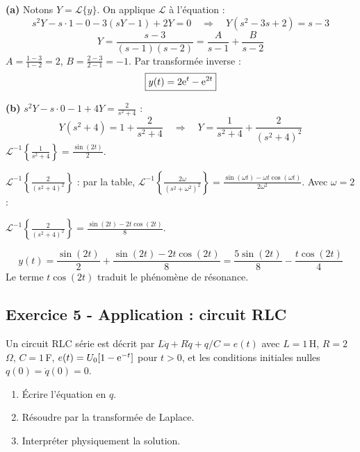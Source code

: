 \documentclass[12pt,a4paper]{article}
\begin{document}
\begin{boitecorrige}
\textbf{(a)} Notons $Y=\mathcal{L}\{y\}$. On applique $\mathcal{L}$ à l'équation :
\[
s^2Y-s\cdot1-0 - 3(sY-1) + 2Y = 0 \quad\Rightarrow\quad Y(s^2-3s+2) = s-3
\]
\[
Y = \frac{s-3}{(s-1)(s-2)} = \frac{A}{s-1}+\frac{B}{s-2}
\]
$A = \frac{1-3}{1-2}=2$, $B=\frac{2-3}{2-1}=-1$. Par transformée inverse :
\[
\boxed{y(t) = 2\mathrm{e}^t - \mathrm{e}^{2t}}
\]

\textbf{(b)} $s^2Y - s\cdot0 - 1 + 4Y = \frac{2}{s^2+4}$ :
\[
Y(s^2+4) = 1+\frac{2}{s^2+4} \quad\Rightarrow\quad Y = \frac{1}{s^2+4}+\frac{2}{(s^2+4)^2}
\]
$\mathcal{L}^{-1}\left\{\frac{1}{s^2+4}\right\} = \frac{\sin(2t)}{2}$.

$\mathcal{L}^{-1}\left\{\frac{2}{(s^2+4)^2}\right\}$ : par la table, $\mathcal{L}^{-1}\left\{\frac{2\omega}{(s^2+\omega^2)^2}\right\} = \frac{\sin(\omega t)-\omega t\cos(\omega t)}{2\omega^2}$. Avec $\omega=2$ :

$\mathcal{L}^{-1}\left\{\frac{2}{(s^2+4)^2}\right\} = \frac{\sin(2t)-2t\cos(2t)}{8}$.

\[
\boxed{y(t) = \frac{\sin(2t)}{2} + \frac{\sin(2t)-2t\cos(2t)}{8} = \frac{5\sin(2t)}{8} - \frac{t\cos(2t)}{4}}
\]
Le terme $t\cos(2t)$ traduit le phénomène de résonance.
\end{boitecorrige}

\subsection*{Exercice 5 - Application : circuit RLC \niveau{\difficile}}

\begin{boiteexercice}
Un circuit RLC série est décrit par $L\ddot{q} + R\dot{q} + q/C = e(t)$ avec $L=1$\,H, $R=2$\,$\Omega$, $C=1$\,F, $e(t)=U_0[1-\mathrm{e}^{-t}]$ pour $t>0$, et les conditions initiales nulles $q(0)=\dot{q}(0)=0$.
\begin{enumerate}
  \item Écrire l'équation en $q$.
  \item Résoudre par la transformée de Laplace.
  \item Interpréter physiquement la solution.
\end{enumerate}
\end{boiteexercice}
\end{document}
